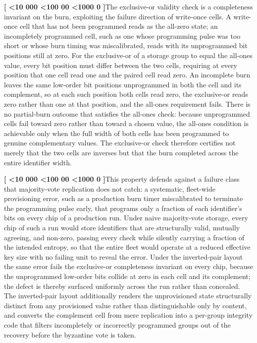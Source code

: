 \documentclass[12pt,letterpaper]{article}
\newcounter{para}
\newcommand{\padzero}{%
  \ifnum\value{para}<10 000\else%
  \ifnum\value{para}<100 00\else%
  \ifnum\value{para}<1000 0\else%
  \fi\fi\fi}
\newcommand{\para}{%
  \refstepcounter{para}\noindent\textbf{[\padzero\arabic{para}]}\hspace{0.5em}\ignorespaces}
\begin{document}
\para The exclusive-or validity check is a completeness invariant on the burn, exploiting the failure direction of write-once cells. A write-once cell that has not been programmed reads as the all-zero state; an incompletely programmed cell, such as one whose programming pulse was too short or whose burn timing was miscalibrated, reads with its unprogrammed bit positions still at zero. For the exclusive-or of a storage group to equal the all-ones value, every bit position must differ between the two cells, requiring at every position that one cell read one and the paired cell read zero. An incomplete burn leaves the same low-order bit positions unprogrammed in both the cell and its complement, so at each such position both cells read zero, the exclusive-or reads zero rather than one at that position, and the all-ones requirement fails. There is no partial-burn outcome that satisfies the all-ones check: because unprogrammed cells fail toward zero rather than toward a chosen value, the all-ones condition is achievable only when the full width of both cells has been programmed to genuine complementary values. The exclusive-or check therefore certifies not merely that the two cells are inverses but that the burn completed across the entire identifier width.

\para This property defends against a failure class that majority-vote replication does not catch: a systematic, fleet-wide provisioning error, such as a production burn timer miscalibrated to terminate the programming pulse early, that programs only a fraction of each identifier's bits on every chip of a production run. Under naive majority-vote storage, every chip of such a run would store identifiers that are structurally valid, mutually agreeing, and non-zero, passing every check while silently carrying a fraction of the intended entropy, so that the entire fleet would operate at a reduced effective key size with no failing unit to reveal the error. Under the inverted-pair layout the same error fails the exclusive-or completeness invariant on every chip, because the unprogrammed low-order bits collide at zero in each cell and its complement; the defect is thereby surfaced uniformly across the run rather than concealed. The inverted-pair layout additionally renders the unprovisioned state structurally distinct from any provisioned value rather than distinguishable only by content, and converts the complement cell from mere replication into a per-group integrity code that filters incompletely or incorrectly programmed groups out of the recovery before the byzantine vote is taken.
\end{document}
